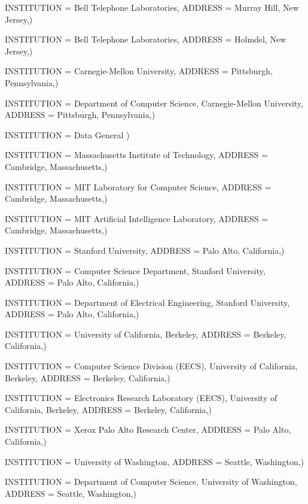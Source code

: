     INSTITUTION = {Bell Telephone Laboratories},
    ADDRESS = {Murray Hill, New Jersey},)

    INSTITUTION = {Bell Telephone Laboratories},
    ADDRESS = {Holmdel, New Jersey},)

    INSTITUTION = {Carnegie-Mellon University},
    ADDRESS = {Pittsburgh, Pennsylvania},)

    INSTITUTION = {Department of Computer Science, Carnegie-Mellon University},
    ADDRESS = {Pittsburgh, Pennsylvania},)

    INSTITUTION = {Data General}
)

    INSTITUTION = {Massachusetts Institute of Technology},
    ADDRESS = {Cambridge, Massachusetts},)

    INSTITUTION = {MIT Laboratory for Computer Science},
    ADDRESS = {Cambridge, Massachusetts},)

    INSTITUTION = {MIT Artificial Intelligence Laboratory},
    ADDRESS = {Cambridge, Massachusetts},)

    INSTITUTION = {Stanford University},
    ADDRESS = {Palo Alto, California},)

    INSTITUTION = {Computer Science Department, Stanford University},
    ADDRESS = {Palo Alto, California},)

    INSTITUTION = {Department of Electrical Engineering, Stanford University},
    ADDRESS = {Palo Alto, California},)

    INSTITUTION = {University of California, Berkeley},
    ADDRESS = {Berkeley, California},)

    INSTITUTION = {Computer Science Division (EECS), University of California, Berkeley},
    ADDRESS = {Berkeley, California},)

    INSTITUTION = {Electronics Research Laboratory (EECS), University of California, Berkeley},
    ADDRESS = {Berkeley, California},)

    INSTITUTION = {Xerox Palo Alto Research Center},
    ADDRESS = {Palo Alto, California},)
    
    INSTITUTION = {University of Washington},
    ADDRESS = {Seattle, Washington},)
    
    INSTITUTION = {Department of Computer Science, University of Washington},
    ADDRESS = {Seattle, Washington},)


